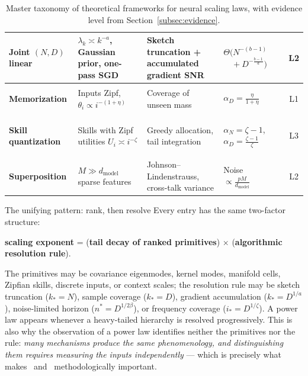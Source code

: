 \documentclass[11pt,a4paper]{article}
\theoremstyle{definition}
\begin{document}
\begin{table}[htbp]
\begin{tabularx}{\textwidth}{>{\bfseries\raggedright\arraybackslash}p{2.4cm} >{\raggedright\arraybackslash}p{2.4cm} >{\raggedright\arraybackslash}X >{\raggedright\arraybackslash}p{2.8cm} >{\raggedright\arraybackslash}p{1.6cm} c}
\midrule
\textbf{Joint $(N,D)$ linear} & $\lambda_k\asymp k^{-a}$, Gaussian prior, one-pass SGD & Sketch truncation + accumulated gradient SNR & $\Theta(N^{-(b-1)}$\newline $\quad + D^{-\frac{b-1}{a}})$ & \cite{lin2024scaling,lin2025reuse,maloney2022solvable,paquette2024phases} & L2 \\
\midrule
\textbf{Memorization} & Inputs Zipf, $\theta_i\propto i^{-(1+\eta)}$ & Coverage of unseen mass & $\alpha_D = \frac{\eta}{1+\eta}$ & \cite{hutter2021learning} & L1 \\
\midrule
\textbf{Skill quantization} & Skills with Zipf utilities $U_i\asymp i^{-\zeta}$ & Greedy allocation, tail integration & $\alpha_N=\zeta-1$, $\alpha_D=\frac{\zeta-1}{\zeta}$ & \cite{michaud2023quantization,nam2024exactly,cabannes2024associative} & L3 \\
\midrule
\textbf{Superposition} & $M\gg d_{\mathrm{model}}$ sparse features & Johnson--Lindenstrauss, cross-talk variance & Noise $\propto \frac{pM}{d_{\mathrm{model}}}$ & \cite{elhage2022toy,johnson1984extensions} & L2 \\
\bottomrule
\end{tabularx}
\caption{Master taxonomy of theoretical frameworks for neural scaling laws, with evidence level from Section~\ref{subsec:evidence}.}
\label{tab:master_taxonomy}
\end{table}

\begin{takeaway}{The unifying pattern: rank, then resolve}
Every entry has the same two-factor structure:
\begin{center}
\textbf{scaling exponent} = (\textbf{tail decay of ranked primitives}) $\times$ (\textbf{algorithmic resolution rule}).
\end{center}
The primitives may be covariance eigenmodes, kernel modes, manifold cells, Zipfian skills, discrete inputs, or context scales; the resolution rule may be sketch truncation ($k_*=N$), sample coverage ($k_*=D$), gradient accumulation ($k_*=D^{1/a}$), noise-limited horizon ($n^*=D^{1/2\beta}$), or frequency coverage ($i_*=D^{1/\zeta}$). A power law appears whenever a heavy-tailed hierarchy is resolved progressively. This is also why the observation of a power law identifies neither the primitives nor the rule: \emph{many mechanisms produce the same phenomenology, and distinguishing them requires measuring the inputs independently} --- which is precisely what makes~\cite{cagnetta2026deriving} and~\cite{barkeshli2026origin} methodologically important.
\end{takeaway}
\end{document}
